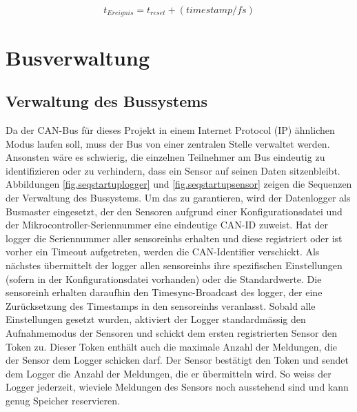 \begin{equation}\label{eq.timestamp}
t_{Ereignis} = t_{reset} + (timestamp/fs)
\end{equation}

\section{Busverwaltung}

\subsection{Verwaltung des Bussystems}\label{subsec.sw_busverwaltung}

Da der CAN-Bus für dieses Projekt in einem Internet Protocol (IP) ähnlichen Modus laufen soll, muss der Bus von einer zentralen Stelle verwaltet werden. Ansonsten wäre es schwierig, die einzelnen Teilnehmer am Bus eindeutig zu identifizieren oder zu verhindern, dass ein Sensor auf seinen Daten sitzenbleibt. Abbildungen \ref{fig.seqstartuplogger} und \ref{fig.seqstartupsensor} zeigen die Sequenzen der Verwaltung des Bussystems.
Um das zu garantieren, wird der Datenlogger als Busmaster eingesetzt, der den Sensoren aufgrund einer Konfigurationsdatei und der Mikrocontroller-Seriennummer eine eindeutige CAN-ID zuweist. Hat der \gls{logger} die Seriennummer aller \glspl{sensoreinh} erhalten und diese registriert oder ist vorher ein Timeout aufgetreten, werden die CAN-Identifier verschickt. Als nächstes übermittelt der \gls{logger} allen \glspl{sensoreinh} ihre spezifischen Einstellungen (sofern in der Konfigurationsdatei vorhanden) oder die Standardwerte. Die \gls{sensoreinh} erhalten daraufhin den Timesync-Broadcast des \gls{logger}, der eine Zurücksetzung des Timestamps in den \glspl{sensoreinh} veranlasst. Sobald alle Einstellungen gesetzt wurden, aktiviert der Logger standardmässig den Aufnahmemodus der Sensoren und schickt dem ersten registrierten Sensor den Token zu. Dieser Token enthält auch die maximale Anzahl der Meldungen, die der Sensor dem Logger schicken darf. Der Sensor bestätigt den Token und sendet dem Logger die Anzahl der Meldungen, die er übermitteln wird. So weiss der Logger jederzeit, wieviele Meldungen des Sensors noch ausstehend sind und kann genug Speicher reservieren.

